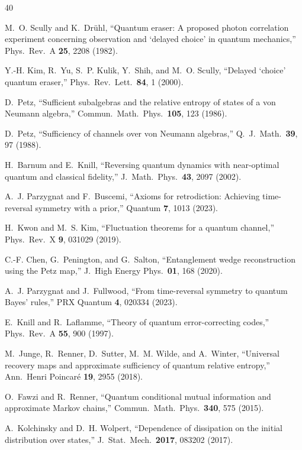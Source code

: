 \documentclass[prl,twocolumn,superscriptaddress,longbibliography,floatfix]{revtex4-2}
\begin{document}
\begin{thebibliography}{40}

M.~O. Scully and K.~Dr\"uhl,
``Quantum eraser: A proposed photon correlation experiment concerning
observation and `delayed choice' in quantum mechanics,''
Phys.\ Rev.\ A \textbf{25}, 2208 (1982).

Y.-H. Kim, R.~Yu, S.~P. Kulik, Y.~Shih, and M.~O. Scully,
``Delayed `choice' quantum eraser,''
Phys.\ Rev.\ Lett.\ \textbf{84}, 1 (2000).

D.~Petz,
``Sufficient subalgebras and the relative entropy of states of a
von Neumann algebra,''
Commun.\ Math.\ Phys.\ \textbf{105}, 123 (1986).

D.~Petz,
``Sufficiency of channels over von Neumann algebras,''
Q.\ J.\ Math.\ \textbf{39}, 97 (1988).

H.~Barnum and E.~Knill,
``Reversing quantum dynamics with near-optimal quantum and classical
fidelity,''
J.\ Math.\ Phys.\ \textbf{43}, 2097 (2002).

A.~J. Parzygnat and F.~Buscemi,
``Axioms for retrodiction: Achieving time-reversal symmetry with a
prior,''
Quantum \textbf{7}, 1013 (2023).

H.~Kwon and M.~S. Kim,
``Fluctuation theorems for a quantum channel,''
Phys.\ Rev.\ X \textbf{9}, 031029 (2019).

C.-F. Chen, G.~Penington, and G.~Salton,
``Entanglement wedge reconstruction using the Petz map,''
J.\ High Energy Phys.\ \textbf{01}, 168 (2020).

A.~J. Parzygnat and J.~Fullwood,
``From time-reversal symmetry to quantum Bayes' rules,''
PRX Quantum \textbf{4}, 020334 (2023).

E.~Knill and R.~Laflamme,
``Theory of quantum error-correcting codes,''
Phys.\ Rev.\ A \textbf{55}, 900 (1997).

M.~Junge, R.~Renner, D.~Sutter, M.~M. Wilde, and A.~Winter,
``Universal recovery maps and approximate sufficiency of quantum
relative entropy,''
Ann.\ Henri Poincar\'e \textbf{19}, 2955 (2018).

O.~Fawzi and R.~Renner,
``Quantum conditional mutual information and approximate Markov
chains,''
Commun.\ Math.\ Phys.\ \textbf{340}, 575 (2015).

A.~Kolchinsky and D.~H. Wolpert,
``Dependence of dissipation on the initial distribution over states,''
J.\ Stat.\ Mech.\ \textbf{2017}, 083202 (2017).


\end{thebibliography}
\end{document}
